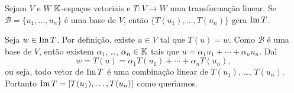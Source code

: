 \begin{lema}\label{transformacao_gera_imagem}
	Sejam $V$ e $W$ $\mathbb{K}$-espa\c{c}os vetoriais e $T : V \to W$ uma transforma\c{c}\~ao linear. Se $\mathcal{B} = \{u_1, \dots, u_n\}$ \'e uma base de $V$, ent\~ao $\{T(u_1), \dots, T(u_n)\}$ gera ${\rm Im\,} T$.
\end{lema}
\begin{prova}
	Seja $w \in {\rm Im\,} T$. Por defini\c{c}\~ao, existe $u \in V$ tal que $T(u) = w$. Como $\mathcal{B}$ \'e uma base de $V$, ent\~ao existem $\alpha_1$, \dots, $\alpha_n \in \mathbb{K}$ tais que $u = \alpha_1u_1 + \cdots + \alpha_nu_n$. Da{\'\i}
	\[
		w = T(u) = \alpha_1T(u_1) + \cdots + \alpha_nT(u_n),
	\]
	ou seja, todo vetor de ${\rm Im\,} T$ \'e uma combina\c{c}\~ao linear de $T(u_1)$, \dots, $T(u_n)$. Portanto ${\rm Im\,} T = [T(u_1), \dots, T(u_n)]$ como quer{\'\i}amos.
\end{prova}

